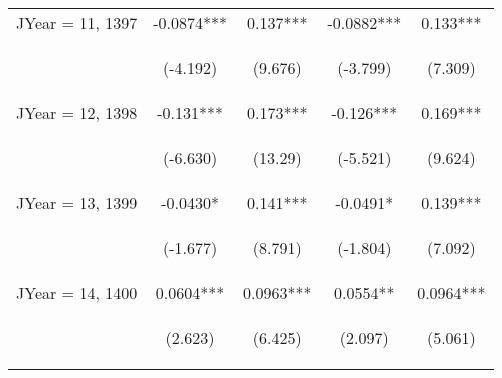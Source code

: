 \documentclass[]{article}
\begin{document}
\begin{center}
\begin{tabular}{lcccc}
JYear = 11, 1397 & -0.0874*** & 0.137*** & -0.0882*** & 0.133*** \\
\vspace{4pt} & \begin{footnotesize}(-4.192)\end{footnotesize} & \begin{footnotesize}(9.676)\end{footnotesize} & \begin{footnotesize}(-3.799)\end{footnotesize} & \begin{footnotesize}(7.309)\end{footnotesize} \\
JYear = 12, 1398 & -0.131*** & 0.173*** & -0.126*** & 0.169*** \\
\vspace{4pt} & \begin{footnotesize}(-6.630)\end{footnotesize} & \begin{footnotesize}(13.29)\end{footnotesize} & \begin{footnotesize}(-5.521)\end{footnotesize} & \begin{footnotesize}(9.624)\end{footnotesize} \\
JYear = 13, 1399 & -0.0430* & 0.141*** & -0.0491* & 0.139*** \\
\vspace{4pt} & \begin{footnotesize}(-1.677)\end{footnotesize} & \begin{footnotesize}(8.791)\end{footnotesize} & \begin{footnotesize}(-1.804)\end{footnotesize} & \begin{footnotesize}(7.092)\end{footnotesize} \\
JYear = 14, 1400 & 0.0604*** & 0.0963*** & 0.0554** & 0.0964*** \\
\vspace{4pt} & \begin{footnotesize}(2.623)\end{footnotesize} & \begin{footnotesize}(6.425)\end{footnotesize} & \begin{footnotesize}(2.097)\end{footnotesize} & \begin{footnotesize}(5.061)\end{footnotesize} \\

\end{tabular}
\end{center}
\end{document}
